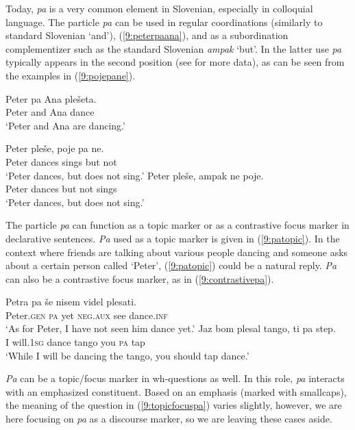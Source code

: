 \documentclass[output=paper,modfonts,newtxmath,hidelinks]{langscibook}
\begin{document}
Today, \textit{pa} is a very common element in Slovenian, especially in colloquial language. The particle \textit{pa} can be used in regular coordinations (similarly to standard Slovenian `and'), (\ref{9:peterpaana}), and as a subordination complementizer such as the standard Slovenian \textit{ampak} `but'. In the latter use \textit{pa} typically appears in the second position (see \citealt{marusicetal2011pa} for more data), as can be seen from the examples in (\ref{9:pojepane}).

\begin{exe}
\ex \label{9:peterpaana}
\gll Peter 	pa Ana plešeta. \\
	Peter 	and Ana dance\\
\trans  `Peter and Ana are dancing.' 
\ex \label{9:pojepane}
\begin{xlist}
\ex \gll	Peter pleše, poje pa ne. \\
 		Peter 	dances sings but not\\
\trans `Peter dances, but does not sing.'
\ex \gll 	Peter pleše, ampak ne poje. \\
 	Peter 	dances but not sings\\
 \trans `Peter dances, but does not sing.'
\end{xlist}
\end{exe}

\noindent The particle \textit{pa} can function as a topic marker or as a contrastive focus marker in declarative sentences. \textit{Pa} used as a topic marker is given in (\ref{9:patopic}). In the context where friends are talking about various people dancing and someone asks about a certain person called `Peter', (\ref{9:patopic}) could be a natural reply. \textit{Pa} can also be a contrastive focus marker, as in (\ref{9:contrastivepa}). 

\begin{exe}
\ex \label{9:patopic}
\gll  Petra 	pa še nisem videl plesati.\\
 	Peter.\textsc{gen} 	\textsc{pa} yet \textsc{neg.aux} see dance.\textsc{inf} \\
\trans   `As for Peter, I have not seen him dance yet.' 
\ex \label{9:contrastivepa}
\gll Jaz bom plesal tango, ti pa step.\\
 	I will.\textsc{1sg} dance tango you \textsc{pa} tap\\
\trans   `While I will be dancing the tango, you should tap dance.' 
\end{exe}

\noindent \textit{Pa} can be a topic/focus marker in wh-questions as well. In this role, \textit{pa} interacts with an emphasized constituent. Based on an emphasis (marked with smallcaps), the meaning of the question in (\ref{9:topicfocuspa}) varies slightly, however, we are here focusing on \textit{pa} as a discourse marker, so we are leaving these cases aside.
\end{document}
